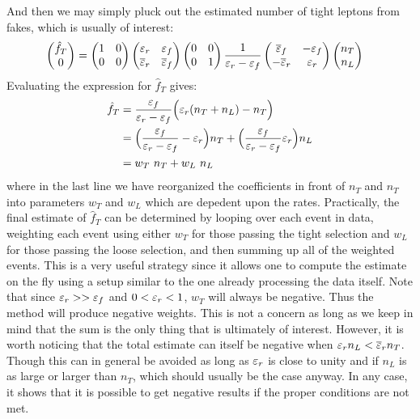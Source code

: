 And then we may simply pluck out the estimated number of tight leptons
from fakes, which is usually of interest:
\begin{align}
  \label{eq:mxm_final_single2}
  \begin{pmatrix} \hat{f}_T \\ 0 \end{pmatrix} 
  &=
  \begin{pmatrix}
  1 & 0\\ 0 & 0
  \end{pmatrix} 
  \begin{pmatrix}
  \varepsilon_r & \varepsilon_f \\ \overline{\varepsilon}_r & \overline{\varepsilon}_f
  \end{pmatrix} 
  \begin{pmatrix}
  0 & 0\\ 0 & 1
  \end{pmatrix} 
  \frac{1}{\varepsilon_r-\varepsilon_f}
  \begin{pmatrix}
  \overline{\varepsilon}_f & -\varepsilon_f \\ -\overline{\varepsilon}_r& \varepsilon_r
  \end{pmatrix} 
  \begin{pmatrix} n_T\\ n_L \end{pmatrix}
\end{align}
Evaluating the expression for $\hat{f}_T$ gives:
\begin{align}
\hat{f}_T &= \frac{\varepsilon_f}{\varepsilon_r-\varepsilon_f} \Big( \varepsilon_r(n_T+n_L) - n_T \Big)  \\
           &= \Big( \frac{\varepsilon_f}{\varepsilon_r-\varepsilon_f} 
	      -\varepsilon_r\Big) n_T 
	      + \Big(\frac{\varepsilon_f}{\varepsilon_r-\varepsilon_f} \varepsilon_r \Big)n_L\\
           &= w_T~n_T + w_L~n_L
\end{align}
where in the last line we have reorganized the coefficients in front
of $n_T$ and $n_T$ into parameters $w_T$ and $w_L$ which are depedent
upon the rates. Practically, the final estimate of $\hat{f}_T$
can be determined by looping over each event in data, weighting each event
using either $w_T$ for those passing the tight selection and
$w_L$ for those passing the loose selection, and then 
summing up all of the weighted events.  This is a very useful 
strategy since it allows one to compute the estimate on the fly
using a setup similar to the one already processing the data itself. %
Note that since $\varepsilon_r>>\varepsilon_f$ and $0<\varepsilon_r<1$,
$w_T$ will always be negative. Thus the method will produce negative weights.
This is not a concern as long as we keep in mind that the sum
is the only thing that is ultimately of interest.
However, it is worth noticing that the total estimate can itself
be negative when $\varepsilon_r n_L< \overline{\varepsilon}_r n_T$.
Though this can in general be avoided as long as $\varepsilon_r$
is close to unity and if $n_L$ is
as large or larger than $n_T$, which should usually be the case
anyway. In any case, it shows that it is possible to get negative
results if the proper conditions are not met.

